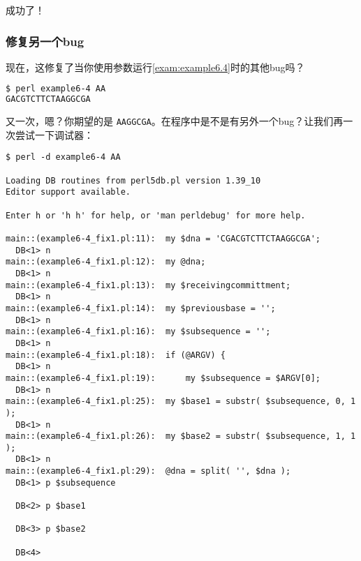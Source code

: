成功了！

\subsubsection{修复另一个bug}
现在，这修复了当你使用参数运行\autoref{exam:example6.4}时的其他bug吗？

\begin{lstlisting}[language=bash]
$ perl example6-4 AA
GACGTCTTCTAAGGCGA
\end{lstlisting}

又一次，嗯？你期望的是 \verb|AAGGCGA|。在程序中是不是有另外一个bug？让我们再一次尝试一下调试器：

%
%
%
%
%
%
\begin{lstlisting}
$ perl -d example6-4 AA

Loading DB routines from perl5db.pl version 1.39_10
Editor support available.

Enter h or 'h h' for help, or 'man perldebug' for more help.

main::(example6-4_fix1.pl:11):	my $dna = 'CGACGTCTTCTAAGGCGA';
  DB<1> n
main::(example6-4_fix1.pl:12):	my @dna;
  DB<1> n
main::(example6-4_fix1.pl:13):	my $receivingcommittment;
  DB<1> n
main::(example6-4_fix1.pl:14):	my $previousbase = '';
  DB<1> n
main::(example6-4_fix1.pl:16):	my $subsequence = '';
  DB<1> n
main::(example6-4_fix1.pl:18):	if (@ARGV) {
  DB<1> n
main::(example6-4_fix1.pl:19):	    my $subsequence = $ARGV[0];
  DB<1> n
main::(example6-4_fix1.pl:25):	my $base1 = substr( $subsequence, 0, 1 );
  DB<1> n
main::(example6-4_fix1.pl:26):	my $base2 = substr( $subsequence, 1, 1 );
  DB<1> n
main::(example6-4_fix1.pl:29):	@dna = split( '', $dna );
  DB<1> p $subsequence

  DB<2> p $base1

  DB<3> p $base2

  DB<4> 
\end{lstlisting}

